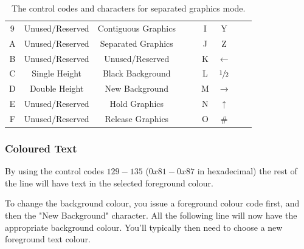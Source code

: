 \begin{table}
\begin{tabular}{|c|c|c|c|c|c|c|c|c|}
 9 &Unused/Reserved&Contiguous Graphics		& \sepsix{\ff}{\bb}{\bb}{\ff}{\bb}{\bb} & \sepsix{\ff}{\bb}{\bb}{\ff}{\ff}{\bb} & I & Y           & \sepsix{\ff}{\bb}{\bb}{\ff}{\bb}{\ff} & \sepsix{\ff}{\bb}{\bb}{\ff}{\ff}{\ff}\\
 A &Unused/Reserved&Separated Graphics		& \sepsix{\bb}{\ff}{\bb}{\ff}{\bb}{\bb} & \sepsix{\bb}{\ff}{\bb}{\ff}{\ff}{\bb} & J & Z           & \sepsix{\bb}{\ff}{\bb}{\ff}{\bb}{\ff} & \sepsix{\bb}{\ff}{\bb}{\ff}{\ff}{\ff}\\
 B &Unused/Reserved&Unused/Reserved		& \sepsix{\ff}{\ff}{\bb}{\ff}{\bb}{\bb} & \sepsix{\ff}{\ff}{\bb}{\ff}{\ff}{\bb} & K & $\leftarrow$& \sepsix{\ff}{\ff}{\bb}{\ff}{\bb}{\ff} & \sepsix{\ff}{\ff}{\bb}{\ff}{\ff}{\ff}\\
 C &Single Height  &Black Background		& \sepsix{\bb}{\bb}{\ff}{\ff}{\bb}{\bb} & \sepsix{\bb}{\bb}{\ff}{\ff}{\ff}{\bb} & L &$\sfrac{1}{2}$& \sepsix{\bb}{\bb}{\ff}{\ff}{\bb}{\ff} & \sepsix{\bb}{\bb}{\ff}{\ff}{\ff}{\ff}\\
 D &Double Height  &New Background		& \sepsix{\ff}{\bb}{\ff}{\ff}{\bb}{\bb} & \sepsix{\ff}{\bb}{\ff}{\ff}{\ff}{\bb} & M &$\rightarrow$ & \sepsix{\ff}{\bb}{\ff}{\ff}{\bb}{\ff} & \sepsix{\ff}{\bb}{\ff}{\ff}{\ff}{\ff}\\
 E &Unused/Reserved&Hold Graphics		& \sepsix{\bb}{\ff}{\ff}{\ff}{\bb}{\bb} & \sepsix{\bb}{\ff}{\ff}{\ff}{\ff}{\bb} & N & $\uparrow$  & \sepsix{\bb}{\ff}{\ff}{\ff}{\bb}{\ff} & \sepsix{\bb}{\ff}{\ff}{\ff}{\ff}{\ff}\\
 F &Unused/Reserved&Release Graphics		& \sepsix{\ff}{\ff}{\ff}{\ff}{\bb}{\bb} & \sepsix{\ff}{\ff}{\ff}{\ff}{\ff}{\bb} & O & \#           & \sepsix{\ff}{\ff}{\ff}{\ff}{\bb}{\ff} & \sepsix{\ff}{\ff}{\ff}{\ff}{\ff}{\ff}\\ \hline
\end{tabular}
\caption{The control codes and characters for separated graphics mode.}
\label{tab:sepgraph}
\end{table}

\subsubsection*{Coloured Text}
By using the control codes $129 - 135$ ($0x81 - 0x87$ in hexadecimal) the rest of the line will
have text in the selected foreground colour.

To change the background colour, you issue a foreground colour code first, and then the "New Background" character. All the following line will now have the appropriate background colour.
You'll typically then need to choose a new foreground text colour.

